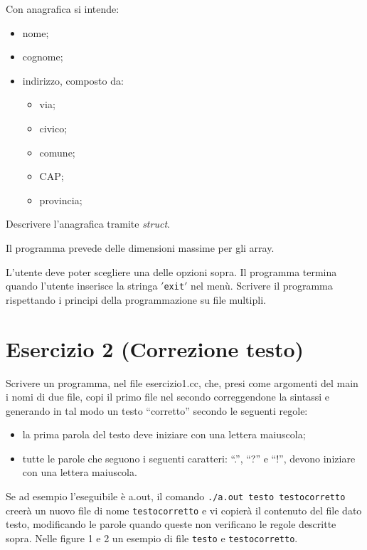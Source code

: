 \documentclass{article}
\begin{document}
    Con anagrafica si intende:

    \begin{itemize}
        \item nome;
        \item cognome;
        \item indirizzo, composto da:
        \begin{itemize}
            \item via;
            \item civico;
            \item comune;
            \item CAP;
            \item provincia;
        \end{itemize}
    \end{itemize}

    \noindent Descrivere l'anagrafica tramite \textit{struct}.

    \noindent Il programma prevede delle dimensioni massime per gli array.

    L'utente deve poter scegliere una delle opzioni sopra.
    Il programma termina quando l'utente inserisce la stringa \('\)\texttt{exit}\('\) nel menù.
    Scrivere il programma rispettando i principi della programmazione su file multipli.

    \section*{Esercizio 2 (Correzione testo)}

    Scrivere un programma, nel file esercizio1.cc, che, presi come argomenti del main i nomi di due file, copi il primo file nel secondo correggendone la sintassi e generando in tal modo un testo “corretto” secondo le seguenti regole:

    \begin{itemize}
        \item la prima parola del testo deve iniziare con una lettera maiuscola;
        \item tutte le parole che seguono i seguenti caratteri: “.”, “?” e “!”, devono iniziare con una lettera maiuscola.
    \end{itemize}

    Se ad esempio l'eseguibile è a.out, il comando \texttt{./a.out testo testocorretto} creerà un nuovo file di nome \texttt{testocorretto} e vi copierà il contenuto del file dato testo, modificando le parole quando queste non verificano le regole descritte sopra. Nelle figure 1 e 2 un esempio di file \texttt{testo} e \texttt{testocorretto}.\\
\end{document}
